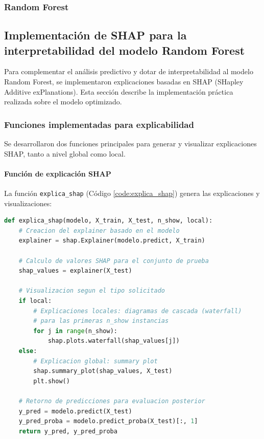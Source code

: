 \subsubsection{Random Forest}
\subsection*{Implementación de SHAP para la interpretabilidad del modelo Random Forest}

Para complementar el análisis predictivo y dotar de interpretabilidad al modelo Random Forest, se implementaron explicaciones basadas en SHAP (SHapley Additive exPlanations). Esta sección describe la implementación práctica realizada sobre el modelo optimizado.

\subsubsection*{Funciones implementadas para explicabilidad}

Se desarrollaron dos funciones principales para generar y visualizar explicaciones SHAP, tanto a nivel global como local.

\paragraph{Función de explicación SHAP}

La función \texttt{explica\_shap} (Código \ref{code:explica_shap}) genera las explicaciones y visualizaciones:

\begin{lstlisting}[language=Python, caption=Función para generar explicaciones SHAP, label=code:explica_shap]
def explica_shap(modelo, X_train, X_test, n_show, local):
    # Creacion del explainer basado en el modelo
    explainer = shap.Explainer(modelo.predict, X_train)
    
    # Calculo de valores SHAP para el conjunto de prueba
    shap_values = explainer(X_test)
    
    # Visualizacion segun el tipo solicitado
    if local:
        # Explicaciones locales: diagramas de cascada (waterfall)
        # para las primeras n_show instancias
        for j in range(n_show):
            shap.plots.waterfall(shap_values[j])
    else:
        # Explicacion global: summary plot
        shap.summary_plot(shap_values, X_test)
        plt.show()
    
    # Retorno de predicciones para evaluacion posterior
    y_pred = modelo.predict(X_test)
    y_pred_proba = modelo.predict_proba(X_test)[:, 1]
    return y_pred, y_pred_proba
\end{lstlisting}

